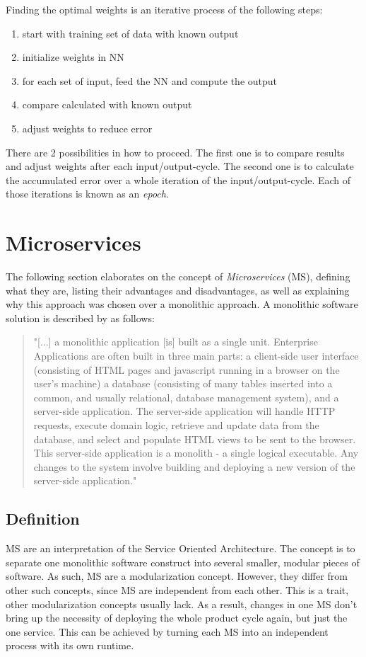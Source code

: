 Finding the optimal weights is an iterative process of the following steps:
\begin{enumerate}
	\item start with training set of data with known output
	\item initialize weights in NN
	\item for each set of input, feed the NN and compute the output
	\item compare calculated with known output
	\item adjust weights to reduce error
\end{enumerate}

There are 2 possibilities in how to proceed. The first one is to compare results and adjust weights after each input/output-cycle. The second one is to calculate the accumulated error over a whole iteration of the input/output-cycle. Each of those iterations is known as an \emph{epoch}\cite{Bourg04}.


\section{Microservices}
The following section elaborates on the concept of \emph{Microservices} (MS), defining what they are, listing their advantages and disadvantages, as well as explaining why this approach was chosen over a monolithic approach. A monolithic software solution is described by \cite{Lewis14} as follows:
\begin{quotation}
	"[...] a monolithic application [is] built as a single unit. Enterprise Applications are often built in three main parts: a client-side user interface (consisting of HTML pages and javascript running in a browser on the user's machine) a database (consisting of many tables inserted into a common, and usually relational, database management system), and a server-side application. The server-side application will handle HTTP requests, execute domain logic, retrieve and update data from the database, and select and populate HTML views to be sent to the browser. This server-side application is a monolith - a single logical executable. Any changes to the system involve building and deploying a new version of the server-side application."
\end{quotation}


\subsection{Definition}
\label{sec2_msDef}
MS are an interpretation of the Service Oriented Architecture. The concept is to separate one monolithic software construct into several smaller, modular pieces of software\cite{Wolff16}. As such, MS are a modularization concept. However, they differ from other such concepts, since MS are independent from each other. This is a trait, other modularization concepts usually lack\cite{Wolff16}. As a result, changes in one MS don't bring up the necessity of deploying the whole product cycle again, but just the one service. This can be achieved by turning each MS into an independent process with its own runtime\cite{Lewis14}.

